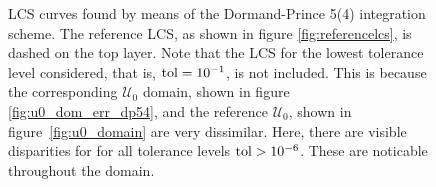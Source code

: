 \begin{figure}[htpb]
    \centering
    
    \caption[LCS curves found by means of the Dormand-Prince 5(4) integration
    scheme]{
        LCS curves found by means of the Dormand-Prince 5(4) integration
        scheme. The reference LCS, as shown in figure
        \ref{fig:referencelcs}, is dashed on the top layer. Note that
        the LCS for the lowest tolerance level considered, that is,
        $\textnormal{tol}=10^{-1}$, is not included. This is because the
        corresponding $\mathcal{U}_{0}$ domain, shown in figure
        \ref{fig:u0_dom_err_dp54}, and the reference $\mathcal{U}_{0}$, shown
        in figure~\ref{fig:u0_domain} are very dissimilar. Here, there are visible
        disparities for for all tolerance levels $\textnormal{tol}>10^{-6}$.
        These are noticable throughout the domain.}
    \label{fig:lcs_rkdp54}
\end{figure}

